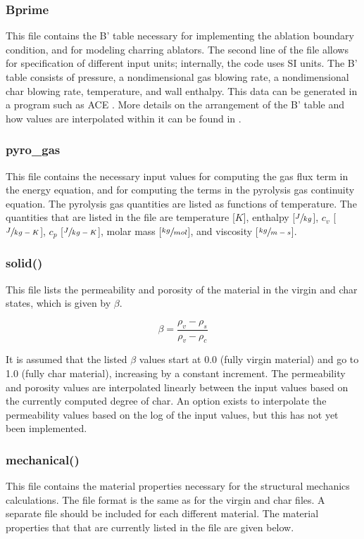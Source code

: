 \documentclass[]{article}
\begin{document}
\subsubsection{Bprime}
This file contains the B' table necessary for implementing the ablation boundary condition, and for modeling charring ablators. The second line of the file allows for specification of different input units; internally, the code uses SI units. The B' table consists of pressure, a nondimensional gas blowing rate, a nondimensional char blowing rate, temperature, and wall enthalpy. This data can be generated in a program such as ACE \cite{ACE_SNL1969}. More details on the arrangement of the B' table and how values are interpolated within it can be found in \cite{amar_thesis}.

\subsubsection{pyro\_gas}
This file contains the necessary input values for computing the gas flux term in the energy equation, and for computing the terms in the pyrolysis gas continuity equation. The pyrolysis gas quantities are listed as functions of temperature. The quantities that are listed in the file are temperature [\(K\)], enthalpy [\(\sfrac{J}{kg}\)], \(c_v\) [\(\sfrac{J}{kg-K}\)], \(c_p\) [\(\sfrac{J}{kg-K}\)], molar mass [\(\sfrac{kg}{mol}\)], and viscosity [\(\sfrac{kg}{m-s}\)].

\subsubsection{solid()}
This file lists the permeability and porosity of the material in the virgin and char states, which is given by \(\beta\).
	
\begin{equation} \label{eqn:beta}
	\beta = \frac{\rho_v-\rho_s}{\rho_v-\rho_c}
\end{equation}

It is assumed that the listed \(\beta\) values start at 0.0 (fully virgin material) and go to 1.0 (fully char material), increasing by a constant increment. The permeability and porosity values are interpolated linearly between the input values based on the currently computed degree of char. An option exists to interpolate the permeability values based on the log of the input values, but this has not yet been implemented.
	
\subsubsection{mechanical()}
This file contains the material properties necessary for the structural mechanics calculations. The file format is the same as for the virgin and char files. A separate file should be included for each different material. The material properties that that are currently listed in the file are given below.
\end{document}
